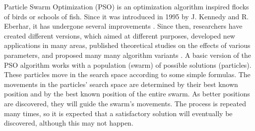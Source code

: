 \documentclass[runningheads]{llncs}
\begin{document}






Particle Swarm Optimization (PSO) is an optimization algorithm
inspired flocks of birds or schools
of fish. Since it was introduced in 1995 by  J. Kennedy and
R. Eberhar, it has undergone several improvements \cite{b1}. %
Since then, researchers have created different versions, which aimed at different
purposes, developed new applications in many areas, published theoretical
studies on the effects of various parameters, and proposed many many
algorithm variants \cite{b2}. A basic version of the PSO algorithm
works with a population (swarm) of possible solutions
(particles). These particles move in the search space according to
some simple formulas. The movements in the particles' search space are
determined by their best known position and by the best known position
of the entire swarm. As better positions are discovered, they will
guide the swarm's movements. The process is repeated many times, so it
is expected that a satisfactory solution will eventually be
discovered, although this may not happen\cite{b3}.
\end{document}
